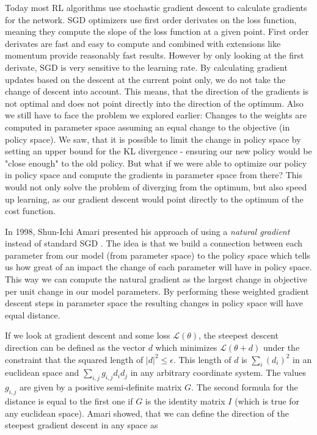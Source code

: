 Today most RL algorithms use stochastic gradient descent to calculate gradients for the network. SGD optimizers use first order derivates on the loss function, meaning they compute the slope of the loss function at a given point. First order derivates are fast and easy to compute and combined with extensions like momentum provide reasonably fast results. However by only looking at the first derivate, SGD is very sensitive to the learning rate. By calculating gradient updates based on the descent at the current point only, we do not take the change of descent into account. This means, that the direction of the gradients is not optimal and does not point directly into the direction of the optimum. Also we still have to face the problem we explored earlier: Changes to the weights are computed in parameter space assuming an equal change to the objective (in policy space). We saw, that it is possible to limit the change in policy space by setting an upper bound for the KL divergence - ensuring our new policy would be "close enough" to the old policy. But what if we were able to optimize our policy in policy space and compute the gradients in parameter space from there? This would not only solve the problem of diverging from the optimum, but also speed up learning, as our gradient descent would point directly to the optimum of the cost function.

In 1998, Shun-Ichi Amari presented his approach of using a \textit{natural gradient} instead of standard SGD \cite{amari1998natural}. The idea is that we build a connection between each parameter from our model (from parameter space) to the policy space which tells us how great of an impact the change of each parameter will have in policy space. This way we can compute the natural gradient as the largest change in objective per unit change in our model parameters. By performing these weighted gradient descent steps in parameter space the resulting changes in policy space will have equal distance.

If we look at gradient descent and some loss $\mathcal{L}(\theta)$, the steepest descent direction can be defined as the vector $d$ which minimizes $\mathcal{L}(\theta + d)$ under the constraint that the squared length of $|d|^2 \leq \epsilon$. This length of $d$ is $\sum_i (d_i)^2$ in an euclidean space and $\sum_{i, j} g_{i, j}d_i d_j$ in any arbitrary coordinate system. The values $g_{i, j}$ are given by a positive semi-definite matrix $G$. The second formula for the distance is equal to the first one if $G$ is the identity matrix $I$ (which is true for any euclidean space). Amari showed, that we can define the direction of the steepest gradient descent in any space as 

